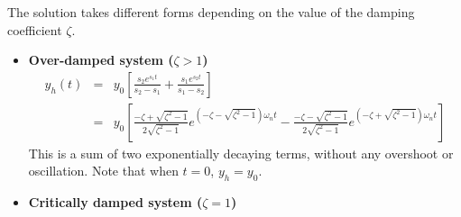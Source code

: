 The solution takes different forms depending on the value of the damping 
coefficient $\zeta$.
\begin{itemize}
\item {\bf Over-damped system ($\zeta>1$)}
  \begin{eqnarray}
    y_h(t)&=&y_0 \left[ \frac{s_2 e^{s_1t}}{s_2-s_1}+\frac{s_1 e^{s_2t}}{s_1-s_2} \right]
    \nonumber \\
    &=&y_0\left[\frac{-\zeta+\sqrt{\zeta^2-1}}{2\sqrt{\zeta^2-1}}e^{(-\zeta-\sqrt{\zeta^2-1})\omega_nt}
      -\frac{-\zeta-\sqrt{\zeta^2-1}}{2\sqrt{\zeta^2-1}}e^{(-\zeta+\sqrt{\zeta^2-1})\omega_nt}\right]
    \nonumber 
  \end{eqnarray}
  This is a sum of two exponentially decaying terms, without any overshoot 
  or oscillation. Note that when $t=0$, $y_h=y_0$. 

\item {\bf Critically damped system ($\zeta=1$)}


\end{itemize}
